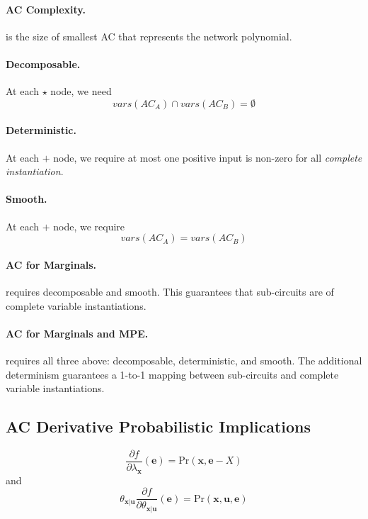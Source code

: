 \documentclass[11pt]{article}
\newcommand{\be}{\mathbf{e}}
\newcommand{\bu}{\mathbf{u}}
\newcommand{\bx}{\mathbf{x}}
\newcommand{\pr}{\mathrm{Pr}}
\begin{document}
\paragraph{AC Complexity.}
is the size of smallest AC that represents the network polynomial. 

\paragraph{Decomposable.}
At each $\star$ node, we need 
\begin{equation}
	vars(AC_A) \cap vars(AC_B) = \emptyset
\end{equation}

\paragraph{Deterministic.}
At each $+$ node, we require at most one positive input is non-zero for all \textit{complete instantiation}. 

\paragraph{Smooth.}
At each $+$ node, we require 
\begin{equation}
	vars(AC_A) = vars(AC_B)
\end{equation}

\paragraph{AC for Marginals.} requires decomposable and smooth. This guarantees that sub-circuits are of complete variable instantiations. 

\paragraph{AC for Marginals and MPE.} requires all three above: decomposable, deterministic, and smooth. The additional determinism guarantees a 1-to-1 mapping between sub-circuits and complete variable instantiations. 


\subsection{AC Derivative Probabilistic Implications}
\begin{equation}
	\frac{\partial f}{\partial \lambda _\bx} (\be) = \pr( \bx, \be - X) 
\end{equation}
and 
\begin{equation}
	\theta_{\bx | \bu} \frac{\partial f}{\partial \theta_{\bx | \bu}} ( \be) = \pr (\bx, \bu, \be)
\end{equation}
\end{document}
